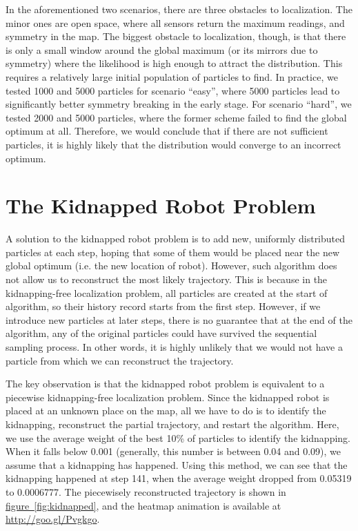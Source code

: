 \documentclass[11pt, a4paper]{article}
\begin{document}
In the aforementioned two scenarios, there are three obstacles to localization. The minor ones are open space, where all sensors return the maximum readings, and symmetry in the map. The biggest obstacle to localization, though, is that there is only a small window around the global maximum (or its mirrors due to symmetry) where the likelihood is high enough to attract the distribution. This requires a relatively large initial population of particles to find. In practice, we tested 1000 and 5000 particles for scenario ``easy'', where 5000 particles lead to significantly better symmetry breaking in the early stage. For scenario ``hard'', we tested 2000 and 5000 particles, where the former scheme failed to find the global optimum at all. Therefore, we would conclude that if there are not sufficient particles, it is highly likely that the distribution would converge to an incorrect optimum.

\clearpage
\section{The Kidnapped Robot Problem}

A solution to the kidnapped robot problem is to add new, uniformly distributed particles at each step, hoping that some of them would be placed near the new global optimum (i.e. the new location of robot). However, such algorithm does not allow us to reconstruct the most likely trajectory. This is because in the kidnapping-free localization problem, all particles are created at the start of algorithm, so their history record starts from the first step. However, if we introduce new particles at later steps, there is no guarantee that at the end of the algorithm, any of the original particles could have survived the sequential sampling process. In other words, it is highly unlikely that we would not have a particle from which we can reconstruct the trajectory.

The key observation is that the kidnapped robot problem is equivalent to a piecewise kidnapping-free localization problem. Since the kidnapped robot is placed at an unknown place on the map, all we have to do is to identify the kidnapping, reconstruct the partial trajectory, and restart the algorithm. Here, we use the average weight of the best 10\% of particles to identify the kidnapping. When it falls below 0.001 (generally, this number is between 0.04 and 0.09), we assume that a kidnapping has happened. Using this method, we can see that the kidnapping happened at step 141, when the average weight dropped from 0.05319 to 0.0006777. The piecewisely reconstructed trajectory is shown in \hyperref[fig:kidnapped]{figure~\ref{fig:kidnapped}}, and the heatmap animation is available at \url{http://goo.gl/Pvgkgo}.
\end{document}
